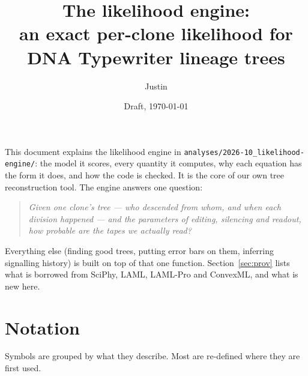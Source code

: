 \documentclass[11pt]{article}
\title{The likelihood engine:\\ an exact per-clone likelihood for DNA Typewriter lineage trees}
\author{Justin}  %
\date{Draft, \today}
\begin{document}
\maketitle

\noindent This document explains the likelihood engine in
\texttt{analyses/2026-10\_likelihood-engine/}: the model it scores, every quantity it computes,
why each equation has the form it does, and how the code is checked. It is the core of our own tree
reconstruction tool. The engine answers one question:

\begin{quote}
\emph{Given one clone's tree --- who descended from whom, and when each division happened --- and
the parameters of editing, silencing and readout, how probable are the tapes we actually read?}
\end{quote}

\noindent Everything else (finding good trees, putting error bars on them, inferring signalling
history) is built on top of that one function. Section~\ref{sec:prov} lists what is borrowed from
SciPhy, LAML, LAML-Pro and ConvexML, and what is new here.

\section*{Notation}
Symbols are grouped by what they describe. Most are re-defined where they are first used.
\end{document}
